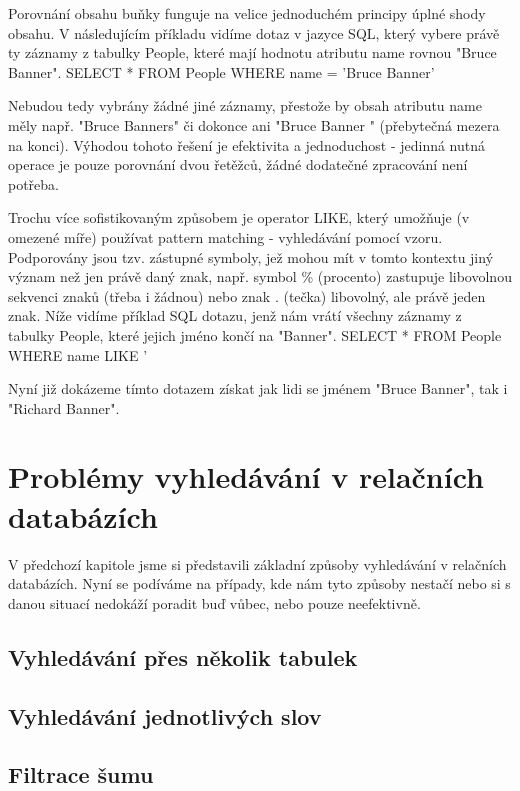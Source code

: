 \documentclass[11pt,draft,oneside]{fithesis2}
\begin{document}
Porovnání obsahu buňky funguje na velice jednoduchém principy úplné shody obsahu. V následujícím příkladu vidíme dotaz v jazyce SQL, který vybere právě ty záznamy z tabulky People, které mají hodnotu atributu name rovnou "Bruce Banner". 
SELECT * FROM People WHERE name = 'Bruce Banner'

Nebudou tedy vybrány žádné jiné záznamy, přestože by obsah atributu name měly např. "Bruce Banners" či dokonce ani "Bruce Banner " (přebytečná mezera na konci). Výhodou tohoto řešení je efektivita a jednoduchost - jedinná nutná operace je 
pouze porovnání dvou řetěžců, žádné dodatečné zpracování není potřeba. 

Trochu více sofistikovaným způsobem je operator LIKE, který umožňuje (v omezené míře) používat pattern matching - vyhledávání pomocí vzoru. Podporovány jsou tzv. zástupné symboly, jež mohou mít v tomto kontextu jiný význam než jen právě daný znak, např. symbol \% 
(procento) zastupuje libovolnou sekvenci znaků (třeba i žádnou) nebo znak . (tečka) libovolný, ale právě jeden znak. Níže vidíme příklad SQL dotazu, jenž nám vrátí všechny záznamy z tabulky People, které jejich jméno končí na "Banner".
SELECT * FROM People WHERE name LIKE '%

Nyní již dokázeme tímto dotazem získat jak lidi se jménem "Bruce Banner", tak i "Richard Banner". 

\section{Problémy vyhledávání v relačních databázích}
V předchozí kapitole jsme si představili základní způsoby vyhledávání v relačních databázích. Nyní se podíváme na případy, kde nám tyto způsoby nestačí nebo si s danou situací nedokáží poradit buď vůbec, nebo pouze neefektivně.

\subsection{Vyhledávání přes několik tabulek}


\subsection{Vyhledávání jednotlivých slov}

\subsection{Filtrace šumu}
\end{document}

